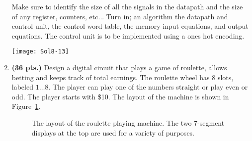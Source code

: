 \begin{enumerate}
        Make sure to identify the size of all the signals in the datapath
        and the size of any register, counters, etc...
        Turn in; an algorithm the datapath and control unit, the control word
        table, the memory input equations, and output equations.
        The control unit is to be implemented using a ones hot encoding.
        \begin{onlysolution}\par
            \texttt{[image: Sol8-13]}
        \end{onlysolution}
    \item \textbf{ (36 pts.)}
        Design a digital circuit that plays a game of
        roulette, allows betting and keeps track of total earnings.
        The roulette wheel has 8 slots, labeled $1 \ldots 8$.  The player
        can play one of the numbers straight or play even or odd.
        The player starts with \$10.
        The layout of the machine is shown in Figure~\ref{fig:Roulette}.
        \begin{figure}[ht]
            \caption{The layout of the roulette playing machine.
                The two 7-segment displays at the top are used for a variety
            of purposes.}
            \label{fig:Roulette}
        \end{figure}


\end{enumerate}
